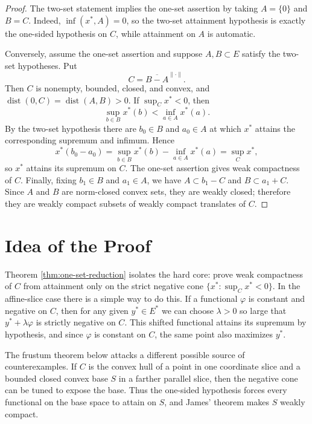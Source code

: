 \documentclass[11pt]{article}
\newcommand{\dist}{\operatorname{dist}}
\begin{document}
\begin{proof}
The two-set statement implies the one-set assertion by taking
\(A=\{0\}\) and \(B=C\). Indeed, \(\inf(x^\ast,A)=0\), so the two-set
attainment hypothesis is exactly the one-sided hypothesis on \(C\), while
attainment on \(A\) is automatic.

Conversely, assume the one-set assertion and suppose \(A,B\subset E\)
satisfy the two-set hypotheses. Put
\[
  C=\overline{B-A}^{\|\cdot\|}.
\]
Then \(C\) is nonempty, bounded, closed, and convex, and
\(\dist(0,C)=\dist(A,B)>0\). If \(\sup_C x^\ast<0\), then
\[
  \sup_{b\in B}x^\ast(b)<\inf_{a\in A}x^\ast(a).
\]
By the two-set hypothesis there are \(b_0\in B\) and \(a_0\in A\) at
which \(x^\ast\) attains the corresponding supremum and infimum. Hence
\[
  x^\ast(b_0-a_0)
  =
  \sup_{b\in B}x^\ast(b)-\inf_{a\in A}x^\ast(a)
  =
  \sup_C x^\ast,
\]
so \(x^\ast\) attains its supremum on \(C\). The one-set assertion gives
weak compactness of \(C\). Finally, fixing \(b_1\in B\) and \(a_1\in A\),
we have \(A\subset b_1-C\) and \(B\subset a_1+C\). Since \(A\) and \(B\)
are norm-closed convex sets, they are weakly closed; therefore they are
weakly compact subsets of weakly compact translates of \(C\).
\end{proof}

\section*{Idea of the Proof}

Theorem \ref{thm:one-set-reduction} isolates the hard core: prove weak
compactness of \(C\) from attainment only on the strict negative cone
\(\{x^\ast:\sup_C x^\ast<0\}\). In the affine-slice case there is a
simple way to do this. If a
functional \(\varphi\) is constant and negative on \(C\), then for any
given \(y^\ast\in E^\ast\) we can choose \(\lambda>0\) so large that
\(y^\ast+\lambda\varphi\) is strictly negative on \(C\). This shifted
functional attains its supremum by hypothesis, and since \(\varphi\) is
constant on \(C\), the same point also maximizes \(y^\ast\).

The frustum theorem below attacks a different possible source of
counterexamples. If \(C\) is the convex hull of a point in one
coordinate slice and a bounded closed convex base \(S\) in a farther
parallel slice, then the negative cone can be tuned to expose the base.
Thus the one-sided hypothesis forces every functional on the base space
to attain on \(S\), and James' theorem makes \(S\) weakly compact.
\end{document}
